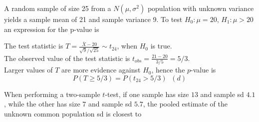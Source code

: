 \documentclass[bigtut]{tutorial}
\begin{document}
\begin{tutorial}
\begin{questions}
\vspace{1cm}
\hspace{-1cm}

\question 
 A random sample of size 25 from a $N(\mu,\sigma^2)$ population with unknown variance
yields a sample mean of 21 and sample variance 9. To test
$H_0\colon\mu=20$, $H_1\colon\mu>20$ an expression for the p-value
is


\begin{solution}
  The test statistic is $T=\frac{\bar X-20}{\sqrt 9/\sqrt{25}}\sim t_{24}$, when $H_0$ is true. \\
The observed value of the test statistic is $t_{obs} = \frac{21-20}{3/5} = 5/3$. \\

 Larger values of $T$ are more evidence against $H_0$, hence the $p$-value is
\[ P(T \geq 5/3) = P( t_{24} > 5/3) \;\; (d) \]
\end{solution} 

\vspace{1cm}
\hspace{-1cm}


\question  
 When performing a two-sample $t$-test, if one sample has size $13$
and sample sd $4.1$, while the other has size $7$ and sample sd $5.7$, the pooled
estimate of the unknown common population sd is closest to
\end{questions}
\end{tutorial}
\end{document}

